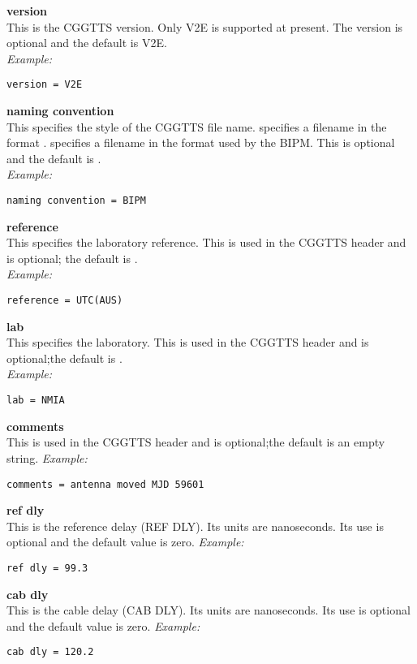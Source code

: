 {\bfseries version}\\
This is the CGGTTS version. 
Only V2E is supported at present.
The version is optional and the default is V2E.
\\
\textit{Example:}
\begin{lstlisting}
version = V2E
\end{lstlisting}

{\bfseries naming convention}\\
This specifies the style of the CGGTTS file name.
 specifies a filename in the format .
 specifies a filename in the format used by the BIPM.
This is optional and the default is .\\
\textit{Example:}
\begin{lstlisting}
naming convention = BIPM
\end{lstlisting}


{\bfseries reference}\\
This specifies the laboratory reference.
This is used in the CGGTTS header and is optional; the default is .\\
\textit{Example:}
\begin{lstlisting}
reference = UTC(AUS)
\end{lstlisting}

{\bfseries lab}\\
This specifies the laboratory.
This is used in the CGGTTS header and is optional;the default is .\\
\textit{Example:}
\begin{lstlisting}
lab = NMIA
\end{lstlisting}

{\bfseries comments}\\
This is used in the CGGTTS header and is optional;the default is an empty string.
\textit{Example:}
\begin{lstlisting}
comments = antenna moved MJD 59601
\end{lstlisting}

{\bfseries ref dly}\\
This is the reference delay (REF DLY).
Its units are nanoseconds.
Its use is optional and the default value is zero.
\textit{Example:}
\begin{lstlisting}
ref dly = 99.3
\end{lstlisting}

{\bfseries cab dly}\\
This is the cable delay (CAB DLY).
Its units are nanoseconds.
Its use is optional and the default value is zero.
\textit{Example:}
\begin{lstlisting}
cab dly = 120.2
\end{lstlisting}

